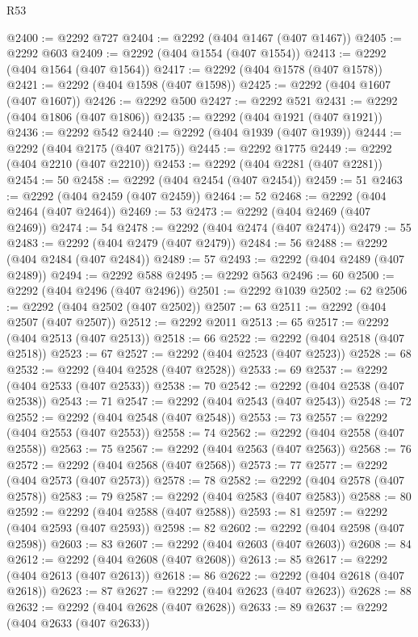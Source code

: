 \begin{lexlean}{R53}
\begin{coremodule}
@2400 := @2292 @727
@2404 := @2292 (@404 @1467 (@407 @1467))
@2405 := @2292 @603
@2409 := @2292 (@404 @1554 (@407 @1554))
@2413 := @2292 (@404 @1564 (@407 @1564))
@2417 := @2292 (@404 @1578 (@407 @1578))
@2421 := @2292 (@404 @1598 (@407 @1598))
@2425 := @2292 (@404 @1607 (@407 @1607))
@2426 := @2292 @500
@2427 := @2292 @521
@2431 := @2292 (@404 @1806 (@407 @1806))
@2435 := @2292 (@404 @1921 (@407 @1921))
@2436 := @2292 @542
@2440 := @2292 (@404 @1939 (@407 @1939))
@2444 := @2292 (@404 @2175 (@407 @2175))
@2445 := @2292 @1775
@2449 := @2292 (@404 @2210 (@407 @2210))
@2453 := @2292 (@404 @2281 (@407 @2281))
@2454 := 50
@2458 := @2292 (@404 @2454 (@407 @2454))
@2459 := 51
@2463 := @2292 (@404 @2459 (@407 @2459))
@2464 := 52
@2468 := @2292 (@404 @2464 (@407 @2464))
@2469 := 53
@2473 := @2292 (@404 @2469 (@407 @2469))
@2474 := 54
@2478 := @2292 (@404 @2474 (@407 @2474))
@2479 := 55
@2483 := @2292 (@404 @2479 (@407 @2479))
@2484 := 56
@2488 := @2292 (@404 @2484 (@407 @2484))
@2489 := 57
@2493 := @2292 (@404 @2489 (@407 @2489))
@2494 := @2292 @588
@2495 := @2292 @563
@2496 := 60
@2500 := @2292 (@404 @2496 (@407 @2496))
@2501 := @2292 @1039
@2502 := 62
@2506 := @2292 (@404 @2502 (@407 @2502))
@2507 := 63
@2511 := @2292 (@404 @2507 (@407 @2507))
@2512 := @2292 @2011
@2513 := 65
@2517 := @2292 (@404 @2513 (@407 @2513))
@2518 := 66
@2522 := @2292 (@404 @2518 (@407 @2518))
@2523 := 67
@2527 := @2292 (@404 @2523 (@407 @2523))
@2528 := 68
@2532 := @2292 (@404 @2528 (@407 @2528))
@2533 := 69
@2537 := @2292 (@404 @2533 (@407 @2533))
@2538 := 70
@2542 := @2292 (@404 @2538 (@407 @2538))
@2543 := 71
@2547 := @2292 (@404 @2543 (@407 @2543))
@2548 := 72
@2552 := @2292 (@404 @2548 (@407 @2548))
@2553 := 73
@2557 := @2292 (@404 @2553 (@407 @2553))
@2558 := 74
@2562 := @2292 (@404 @2558 (@407 @2558))
@2563 := 75
@2567 := @2292 (@404 @2563 (@407 @2563))
@2568 := 76
@2572 := @2292 (@404 @2568 (@407 @2568))
@2573 := 77
@2577 := @2292 (@404 @2573 (@407 @2573))
@2578 := 78
@2582 := @2292 (@404 @2578 (@407 @2578))
@2583 := 79
@2587 := @2292 (@404 @2583 (@407 @2583))
@2588 := 80
@2592 := @2292 (@404 @2588 (@407 @2588))
@2593 := 81
@2597 := @2292 (@404 @2593 (@407 @2593))
@2598 := 82
@2602 := @2292 (@404 @2598 (@407 @2598))
@2603 := 83
@2607 := @2292 (@404 @2603 (@407 @2603))
@2608 := 84
@2612 := @2292 (@404 @2608 (@407 @2608))
@2613 := 85
@2617 := @2292 (@404 @2613 (@407 @2613))
@2618 := 86
@2622 := @2292 (@404 @2618 (@407 @2618))
@2623 := 87
@2627 := @2292 (@404 @2623 (@407 @2623))
@2628 := 88
@2632 := @2292 (@404 @2628 (@407 @2628))
@2633 := 89
@2637 := @2292 (@404 @2633 (@407 @2633))

\end{coremodule}
\end{lexlean}

